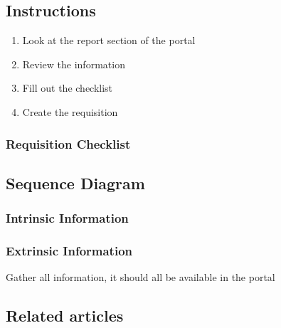 \documentclass[letterpaper,10pt,english]{sphinxmanual}
\begin{document}
\begin{DUlineblock}{0em}
\item[] 
\end{DUlineblock}


\subsection{Instructions}
\label{\detokenize{750-Requisitions:id1}}\begin{enumerate}
%
\item {} 
Look at the report section of the portal

\item {} 
Review the information

\item {} 
Fill out the checklist

\item {} 
Create the requisition

\end{enumerate}


\subsubsection{Requisition Checklist}
\label{\detokenize{750-Requisitions:id2}}

\subsection{Sequence Diagram}
\label{\detokenize{750-Requisitions:id3}}
\noindent{}


\subsubsection{Intrinsic Information}
\label{\detokenize{750-Requisitions:id4}}

\subsubsection{Extrinsic Information}
\label{\detokenize{750-Requisitions:id5}}
Gather all information, it should all be available in the portal


\subsection{Related articles}
\label{\detokenize{750-Requisitions:related-articles}}


\renewcommand{\indexname}{Index}
\printindex
\end{document}
